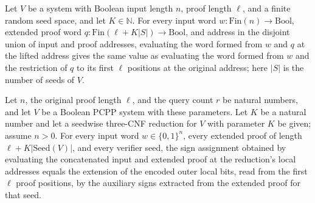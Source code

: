 \begin{theorem}
\label{FABL.inputProofWord_restrictOuterProof_liftOuterAddress}
\leanok
{}
Let $V$ be a system with Boolean input length $n$, proof length $\ell$, and a finite
random seed space, and let $K\in\mathbb N$. For every input word
$w\colon\mathrm{Fin}(n)\to\mathrm{Bool}$, extended proof word
$q\colon\mathrm{Fin}(\ell+K|S|)\to\mathrm{Bool}$, and address in the disjoint union of
input and proof addresses, evaluating the word formed from $w$ and $q$ at the lifted
address gives the same value as evaluating the word formed from $w$ and the restriction
of $q$ to its first $\ell$ positions at the original address; here $|S|$ is the number
of seeds of $V$.
\end{theorem}

\begin{theorem}
\label{FABL.compositionLocalAssignment_eq_extracted}
\leanok
{}
Let $n$, the original proof length $\ell$, and the query count $r$ be natural numbers,
and let $V$ be a Boolean PCPP system with these parameters. Let $K$ be a natural number
and let a seedwise three-CNF reduction for $V$ with parameter $K$ be given; assume
$n>0$. For every input word $w\in\{0,1\}^n$, every extended proof of length
$\ell+K|\mathrm{Seed}(V)|$, and every verifier seed, the sign assignment obtained by
evaluating the concatenated input and extended proof at the reduction's local addresses
equals the extension of the encoded outer local bits, read from the first $\ell$ proof
positions, by the auxiliary signs extracted from the extended proof for that seed.
\end{theorem}

